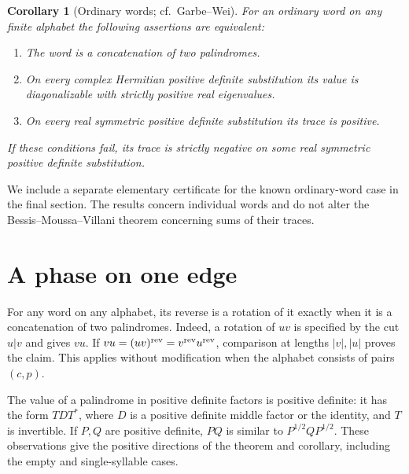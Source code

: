 \documentclass[11pt]{article}
\newtheorem{corollary}[theorem]{Corollary}
\begin{document}
\begin{corollary}[Ordinary words; cf.\ Garbe--Wei]\label{t:ordinary}
For an ordinary word on any finite alphabet the following assertions are equivalent:
\begin{enumerate}[label=(\roman*)]
\item The word is a concatenation of two palindromes.
\item On every complex Hermitian positive definite substitution its value is diagonalizable with strictly positive real eigenvalues.
\item On every real symmetric positive definite substitution its trace is positive.
\end{enumerate}
If these conditions fail, its trace is strictly negative on some real symmetric positive definite substitution.
\end{corollary}

We include a separate elementary certificate for the known ordinary-word case in the final section. The results concern individual words and do not alter the Bessis--Moussa--Villani theorem concerning sums of their traces.

\section{A phase on one edge}

For any word on any alphabet, its reverse is a rotation of it exactly when it is a concatenation of two palindromes. Indeed, a rotation of $uv$ is specified by the cut $u|v$ and gives $vu$. If $vu=(uv)^{\rm rev}=v^{\rm rev}u^{\rm rev}$, comparison at lengths $|v|,|u|$ proves the claim. This applies without modification when the alphabet consists of pairs $(c,p)$.

The value of a palindrome in positive definite factors is positive definite: it has the form $TDT^*$, where $D$ is a positive definite middle factor or the identity, and $T$ is invertible. If $P,Q$ are positive definite, $PQ$ is similar to $P^{1/2}QP^{1/2}$. These observations give the positive directions of the theorem and corollary, including the empty and single-syllable cases.
\end{document}
